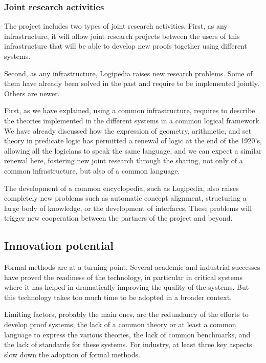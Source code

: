 \subsubsection*{Joint research activities}

The project includes two types of joint research activities.  First,
as any infrastructure, it will allow joint research projects between
the users of this infrastructure that will be able to develop new
proofs together using different systems.

Second, as any infrastructure, Logipedia raises new research
problems. Some of them have already been solved in the past and
require to be implemented jointly. Others are newer.

First, as we have explained, using a common infrastructure, requires
to describe the theories implemented in the different systems in a
common logical framework. We have already discussed how the expression
of geometry, arithmetic, and set theory in predicate logic has
permitted a renewal of logic at the end of the 1920's, allowing all
the logicians to speak the same language, and we can expect a similar
renewal here, fostering new joint research through the sharing, not
only of a common infrastructure, but also of a common language.

The development of a common encyclopedia, such as Logipedia, also
raises completely new problems such as automatic concept alignment,
structuring a large body of knowledge, or the development of
interfaces. These problems will trigger new cooperation between the
partners of the project and beyond.

\subsection{Innovation potential}

Formal methods are at a turning point. Several academic and
industrial successes have proved the readiness of the technology,
in particular in critical systems where it has helped in
dramatically improving the quality of the systems. But this
technology takes too much time to be adopted in a broader context.

Limiting factors, probably the main ones, are the redundancy of the
efforts to develop proof systems, the lack of a common theory or at
least a common language to express the various theories, the lack of
common benchmarks, and the lack of standards for these systems.  For
industry, at least three key aspects slow down the adoption of formal
methods.

